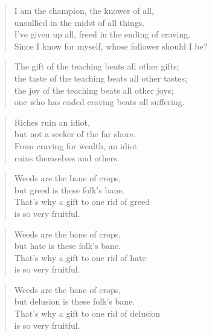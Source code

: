 \documentclass[12pt,openany]{book}%
\begin{document}
\begin{verse}%
I am the champion, the knower of all, \\
unsullied in the midst of all things. \\
I’ve given up all, freed in the ending of craving. \\
Since I know for myself, whose follower should I be? 

%
\end{verse}

\begin{verse}%
The gift of the teaching beats all other gifts; \\
the taste of the teaching beats all other tastes; \\
the joy of the teaching beats all other joys; \\
one who has ended craving beats all suffering. 

%
\end{verse}

\begin{verse}%
Riches ruin an idiot, \\
but not a seeker of the far shore. \\
From craving for wealth, an idiot \\
ruins themselves and others. 

%
\end{verse}

\begin{verse}%
Weeds are the bane of crops, \\
but greed is these folk’s bane. \\
That’s why a gift to one rid of greed \\
is so very fruitful. 

%
\end{verse}

\begin{verse}%
Weeds are the bane of crops, \\
but hate is these folk’s bane. \\
That’s why a gift to one rid of hate \\
is so very fruitful. 

%
\end{verse}

\begin{verse}%
Weeds are the bane of crops, \\
but delusion is these folk’s bane. \\
That’s why a gift to one rid of delusion \\
is so very fruitful. 

%
\end{verse}
\end{document}
